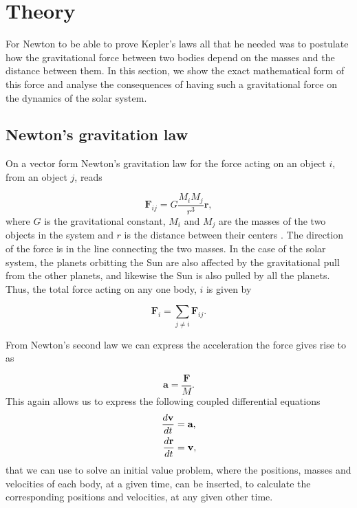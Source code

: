 \documentclass[a4paper]{article}
\begin{document}
\section{Theory}
For Newton to be able to prove Kepler's laws all that he needed was to postulate how the gravitational force between two bodies depend on the masses and the distance between them. In this section, we show the exact mathematical form of this force and analyse the consequences of having such a gravitational force on the dynamics of the solar system.

\subsection{Newton's gravitation law}
On a vector form Newton's gravitation law for the force acting on an object $i$, from an object $j$, reads

\begin{equation}
\textbf{F}_{ij} = G\frac{M_i M_j}{r^3}\textbf{r}, \label{newton}
\end{equation}
where $G$ is the gravitational constant, $M_i$ and $M_j$ are the masses of the two objects in the system and $r$ is the distance between their centers \cite{giordano,goldstein}. The direction of the force is in the line connecting the two masses. In the case of the solar system, the planets orbitting the Sun are also affected by the gravitational pull from the other planets, and likewise the Sun is also pulled by all the planets. Thus, the total force acting on any one body, $i$ is given by

\begin{equation}
\textbf{F}_i = \sum_{j \neq i} \textbf{F}_{ij}.
\end{equation}

From Newton's second law we can express the acceleration the force gives rise to as

\begin{equation}\label{Acceleration}
\textbf{a} = \frac{\textbf{F}}{M}.
\label{accel}
\end{equation}
This again allows us to express the following coupled differential equations
\begin{align}
  \begin{split}
\frac{d\textbf{v}}{dt} &= \textbf{a},\\
\frac{d\textbf{\textbf{r}}}{dt} &= \textbf{v}, \label{coupled_diff}
  \end{split}
\end{align}
that we can use to solve an initial value problem, where the positions, masses and velocities of each body, at a given time, can be inserted, to calculate the corresponding positions and velocities, at any given other time.
\end{document}
